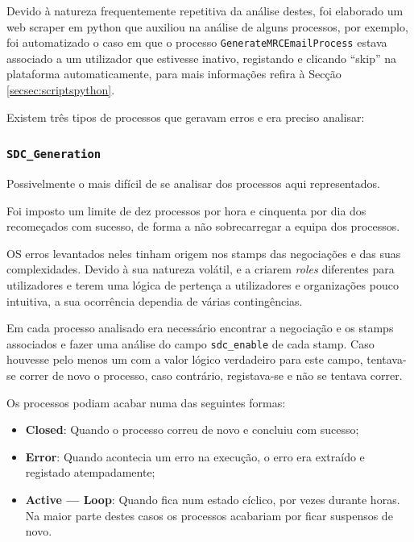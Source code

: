         Devido à natureza frequentemente repetitiva da análise destes, foi elaborado um web scraper em python que auxiliou na análise de alguns processos, por exemplo, foi automatizado o caso em que o processo \texttt{GenerateMRCEmailProcess} estava associado a um utilizador que estivesse inativo, registando e clicando ``skip'' na plataforma automaticamente, para mais informações refira à Secção \ref{secsec:scriptspython}.

        Existem três tipos de processos que geravam erros e era preciso analisar:

        \subsubsection{\texttt{SDC\_Generation}}\label{secsec:sdc_generation}


            Possivelmente o mais difícil de se analisar dos processos aqui representados.

            Foi imposto um limite de dez processos por hora e cinquenta por dia dos recomeçados com sucesso, de forma a não sobrecarregar a equipa dos processos.

            OS erros levantados neles tinham origem nos stamps das negociações e das suas complexidades. Devido à sua natureza volátil, e a criarem \textit{roles} diferentes para utilizadores e terem uma lógica de pertença a utilizadores e organizações pouco intuitiva, a sua ocorrência dependia de várias contingências.

            Em cada processo analisado era necessário encontrar a negociação e os stamps associados e fazer uma análise do campo \texttt{sdc\_enable} de cada stamp. Caso houvesse pelo menos um com a valor lógico verdadeiro para este campo, tentava-se correr de novo o processo, caso contrário, registava-se e não se tentava correr.
            
            Os processos podiam acabar numa das seguintes formas:
            \begin{itemize}
                \item \textbf{Closed}: Quando o processo correu de novo e concluiu com sucesso;
                \item \textbf{Error}: Quando acontecia um erro na execução, o erro era extraído e registado atempadamente;
                \item \textbf{Active --- Loop}: Quando fica num estado cíclico, por vezes durante horas. Na maior parte destes casos os processos acabariam por ficar suspensos de novo.
            \end{itemize}

